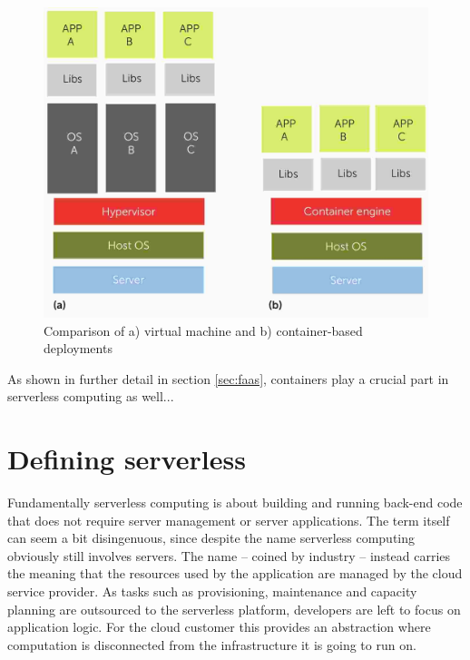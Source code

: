 \documentclass[utf8,english]{gradu3}
\begin{document}
\begin{figure}[h]
  \centering
  \includegraphics[width=\textwidth]{bernstein14-vm-vs-container.jpg}
  \caption{Comparison of a) virtual machine and b) container-based deployments \parencite{bernstein14containers}}
  \label{fig:vmVsContainer}
\end{figure}

As shown in further detail in section \ref{sec:faas}, containers play a crucial part in serverless computing as well...



\section{Defining serverless} \label{sec:definingServerless}


Fundamentally serverless computing is about building and running back-end code that does not require server management or server applications. The term itself can seem a bit disingenuous, since despite the name serverless computing obviously still involves servers. The name -- coined by industry -- instead carries the meaning that the resources used by the application are managed by the cloud service provider. As tasks such as provisioning, maintenance and capacity planning are outsourced to the serverless platform, developers are left to focus on application logic. For the cloud customer this provides an abstraction where computation is disconnected from the infrastructure it is going to run on. \parencite{robert2016serverlessarchitectures,cncf18serverlessWG}
\end{document}
